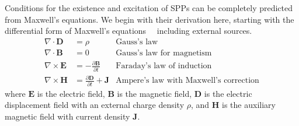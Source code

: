 Conditions for the existence and excitation of SPPs can be completely
predicted from Maxwell's equations.  We begin with their derivation here,
starting with the differential form of Maxwell's
equations~\cite{maier2007plasmonics}~\cite{benson2009elements} including
external sources.
\begin{align}
\nabla \cdot \mathbf{D} &= \rho & \text{Gauss's law} \label{eqn:gausslaw}\\
\nabla \cdot \mathbf{B} &= 0 & \text{Gauss's law for magnetism} \label{eqn:gausslawmagnetism}\\
\nabla \times \mathbf{E} &= -\frac{\partial \mathbf{B}} {\partial t}
& \text{Faraday's law of induction} \label{eqn:faradayslaw} \\
\nabla \times \mathbf{H} &= \frac{\partial \mathbf{D}} {\partial
t} + \mathbf{J}  & \text{Ampere's law with Maxwell's correction}
\label{eqn:ampereslaw}
\end{align}
where $\mathbf{E}$ is the electric field, $\mathbf{B}$ is the magnetic
field, $\mathbf{D}$ is the electric displacement field with an external
charge density $\rho$, and $\mathbf{H}$ is the auxiliary magnetic field
with current density $\mathbf{J}$.

